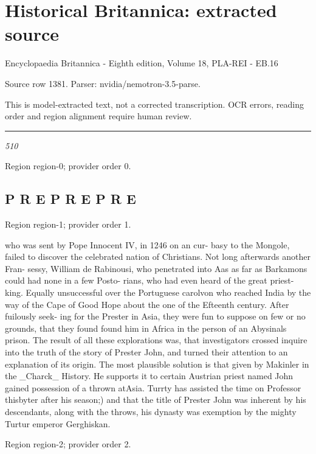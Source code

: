 \documentclass[11pt]{article}
\begin{document}
\section*{Historical Britannica: extracted source}
Encyclopaedia Britannica - Eighth edition, Volume 18, PLA-REI - EB.16\par
{\small Source row 1381. Parser: nvidia/nemotron-3.5-parse.\par}
{\small This is model-extracted text, not a corrected transcription. OCR errors, reading order and region alignment require human review.\par}
\hrule\medskip
{\small\itshape 510\par}

{\scriptsize\color{gray} Region region-0; provider order 0.\par}
\medskip

\subsection*{P R E P R E P R E}

{\scriptsize\color{gray} Region region-1; provider order 1.\par}
\medskip

who was sent by Pope Innocent IV, in 1246 on an cur-
basy to the Mongole, failed to discover the celebrated nation of Christians. Not long afterwards another Fran-
sessy, William de Rabinousi, who penetrated into Aas as far as Barkamons could had none in a few Posto-
rians, who had even heard of the great priest-king.
Equally unsuccessful over the Portuguese carolvon who reached India by the way of the Cape of Good Hope about
the one of the Efteenth century. After fuilously seek-
ing for the Prester in Asia, they were fun to suppose on
few or no grounds, that they found found him in Africa in
the person of an Abysinals prison. The result of all these explorations was, that investigators crossed inquire
into the truth of the story of Prester John, and turned their attention to an explanation of its origin. The most plausible solution is that given by Makinler in the \_Charck\_
History. He supports it to certain Austrian priest named John gained possession of a thrown atAsia.
Turrty has assisted the time on Professor thisbyter after his season;) and that the title of Prester John was inherent by his descendants, along with the throws, his dynasty was exemption by the mighty Turtur emperor Gerghiskan.
\par

{\scriptsize\color{gray} Region region-2; provider order 2.\par}
\medskip
\end{document}
